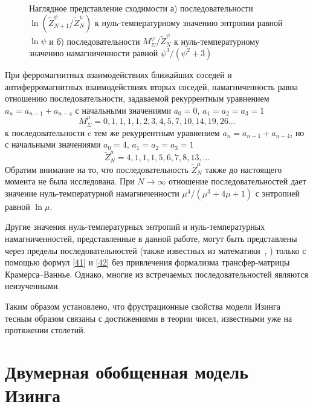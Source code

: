  \begin{figure}[h]
 	\begin{minipage}{0.49\linewidth}
 	\end{minipage}
 	\hfill
 	\begin{minipage}{0.49\linewidth}
 	\end{minipage}
 	\caption{Наглядное представление сходимости а) последовательности $\ln (\widetilde{Z}_{N+1}^{\psi}/\widetilde{Z}_{N}^{\psi})$ к нуль-температурному значению энтропии равной $\ln \psi$ и б) последовательности $M_{\Sigma}^{\psi}/\widetilde{Z}_{N}^{\psi}$ к нуль-температурному значению намагниченности равной $\psi^3/(\psi^2+3)$}
 	\label{fr2}
 \end{figure}

При ферромагнитных взаимодействиях ближайших соседей и антиферромагнитных взаимодействиях вторых соседей, намагниченность равна отношению последовательности, задаваемой рекуррентным уравнением $a_n = a_{n-1} + a_{n-4}$ с начальными значениями $a_0 = 0$, $a_1 = a_2 = a_3 = 1$ \[M^{\mu}_{\Sigma} = 0, 1, 1, 1, 1, 2, 3, 4, 5, 7, 10, 14, 19, 26 \dots\] к последовательности c тем же рекуррентным уравнением $a_n = a_{n-1} + a_{n-4}$, но с начальными значениями $a_0 = 4$, $a_1 = a_2 = a_3 = 1$ \[\widetilde{Z}^{\mu}_{N} = 4, 1, 1, 1, 5, 6, 7, 8, 13, \dots\] Обратим внимание на то, что последовательность $\widetilde{Z}^{\mu}_{N}$ также до настоящего момента не была исследована.
При $N\rightarrow \infty$ отношение последовательностей дает значение нуль-температурной намагниченности $\mu^4/(\mu^3+4\mu+1)$ с энтропией равной $\ln \mu$.

Другие значения нуль-температурных энтропий и нуль-температурных намагниченностей, представленные в данной работе, могут быть представлены через пределы последовательностей (также известных из математики~\cite{sloane1973, sloane1995}, \cite{bicknell1975, vieira2020, adams1982}) только с помощью формул \eqref{41} и \eqref{42} без привлечения формализма трансфер-матрицы Крамерса--Ваннье. Однако, многие из встречаемых последовательностей являются неизученными.

Таким образом установлено, что фрустрационные свойства модели Изинга тесным образом связаны с достижениями в теории чисел, известными уже на протяжении столетий.

\section{Двумерная обобщенная модель Изинга}

